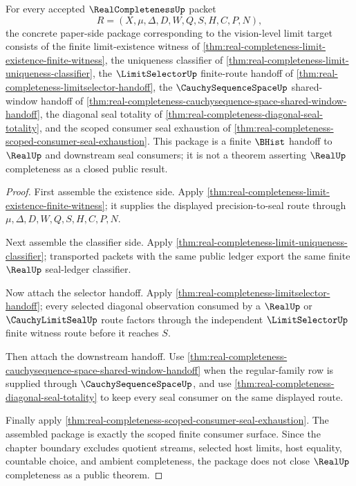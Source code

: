 \begin{theorem}
\label{thm:real-completeness-limit-handoff-package}
For every accepted $\RealCompletenessUp$ packet
$$
R=(X,\mu,\Delta,D,W,Q,S,H,C,P,N),
$$
the concrete paper-side package corresponding to the vision-level limit target consists of the finite limit-existence witness of \autoref{thm:real-completeness-limit-existence-finite-witness}, the uniqueness classifier of \autoref{thm:real-completeness-limit-uniqueness-classifier}, the $\LimitSelectorUp$ finite-route handoff of \autoref{thm:real-completeness-limitselector-handoff}, the $\CauchySequenceSpaceUp$ shared-window handoff of \autoref{thm:real-completeness-cauchysequence-space-shared-window-handoff}, the diagonal seal totality of \autoref{thm:real-completeness-diagonal-seal-totality}, and the scoped consumer seal exhaustion of \autoref{thm:real-completeness-scoped-consumer-seal-exhaustion}. This package is a finite $\BHist$ handoff to $\RealUp$ and downstream seal consumers; it is not a theorem asserting $\RealUp$ completeness as a closed public result.
\end{theorem}
\begin{proof}
First assemble the existence side. Apply \autoref{thm:real-completeness-limit-existence-finite-witness}; it supplies the displayed precision-to-seal route through $\mu,\Delta,D,W,Q,S,H,C,P,N$.

Next assemble the classifier side. Apply \autoref{thm:real-completeness-limit-uniqueness-classifier}; transported packets with the same public ledger export the same finite $\RealUp$ seal-ledger classifier.

Now attach the selector handoff. Apply \autoref{thm:real-completeness-limitselector-handoff}; every selected diagonal observation consumed by a $\RealUp$ or $\CauchyLimitSealUp$ route factors through the independent $\LimitSelectorUp$ finite witness route before it reaches $S$.

Then attach the downstream handoff. Use \autoref{thm:real-completeness-cauchysequence-space-shared-window-handoff} when the regular-family row is supplied through $\CauchySequenceSpaceUp$, and use \autoref{thm:real-completeness-diagonal-seal-totality} to keep every seal consumer on the same displayed route.

Finally apply \autoref{thm:real-completeness-scoped-consumer-seal-exhaustion}. The assembled package is exactly the scoped finite consumer surface. Since the chapter boundary excludes quotient streams, selected host limits, host equality, countable choice, and ambient completeness, the package does not close $\RealUp$ completeness as a public theorem.
\end{proof}

